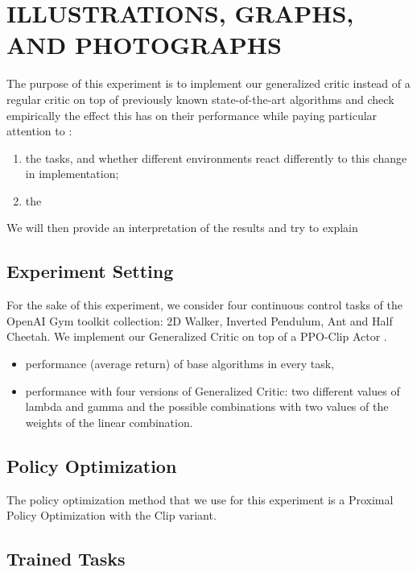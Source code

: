 \section{ILLUSTRATIONS, GRAPHS, AND PHOTOGRAPHS}
\label{sec:illust}

The purpose of this experiment is to implement our generalized critic instead of a regular critic on top of previously known state-of-the-art algorithms and check empirically the effect this has on their performance while paying particular attention to :
\begin{enumerate}
\item the tasks, and whether different environments react differently to this change in implementation;
\item the 
\end{enumerate}

We will then provide an interpretation of the results and try to explain 

\subsection{Experiment Setting}
For the sake of this experiment, we consider four continuous control tasks of the OpenAI Gym toolkit collection: 2D Walker, Inverted Pendulum, Ant and Half Cheetah. 
We implement our Generalized Critic on top of a PPO-Clip Actor \cite{ppo}.
\begin{itemize}
\item performance (average return) of base algorithms in every task,
\item performance with four versions of Generalized Critic: two different values of lambda and gamma and the possible combinations with two values of the weights of the linear combination.
\end{itemize}

\subsection{Policy Optimization}

The policy optimization method that we use for this experiment is a Proximal Policy Optimization with the Clip variant. 


\subsection{Trained Tasks}




